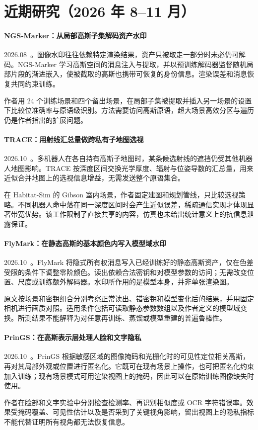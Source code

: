 \section{近期研究（2026 年 8--11 月）}
\paragraph{NGS-Marker：从局部高斯子集解码资产水印}
2026.08~\cite{2608_17447}。图像水印往往依赖特定渲染结果，资产只被取走一部分时未必仍可解码。NGS-Marker 学习高斯空间的消息注入与提取，并以预训练解码器监督随机局部片段的渐进嵌入，使被截取的高斯也携带可恢复的身份信息。渲染误差和消息恢复共同约束训练。

作者用 24 个训练场景和四个留出场景，在局部子集被提取并插入另一场景的设置下比较位准确率与原语级识别。方法需要访问高斯原语，超大场景高效分区与遍历仍是作者指出的扩展问题。

\paragraph{TRACE：用射线汇总量做跨私有子地图选视}
2026.10~\cite{2610_00822}。多机器人在各自持有高斯子地图时，某条候选射线的遮挡仍受其他机器人地图影响。TRACE 按深度区间交换光学厚度、辐射与位姿导数的汇总量，用来近似合并地图上的选视信息增益，无需发送整个原语集合。

在 Habitat-Sim 的 Gibson 室内场景，作者固定建图和规划管线，只比较选视策略。不同机器人命中落在同一深度区间时会产生近似误差，稀疏通信实现才体现显著带宽优势。该工作限制了直接共享的内容，仿真也未给出统计意义上的抗信息泄露保证。

\paragraph{FlyMark：在静态高斯的基本颜色内写入模型域水印}
2026.10~\cite{2610_11364}。FlyMark 将隐式所有权消息写入已经训练好的静态高斯资产，仅在色差受限的条件下调整零阶颜色。读出依赖合法密钥和对模型参数的访问；无需改变位置、尺度或训练额外解码器。水印所作用的是模型本身，并非单张渲染图。

原文按场景和密钥组合分别考察正常读出、错密钥和模型变化后的结果，并用固定相机进行画质对照。适用条件包括可读取静态参数数组以及作者定义的模型域变换。所测结果不能解释为对任意再训练、蒸馏或模型重建的普遍鲁棒性。

\paragraph{PrinGS：在高斯表示层处理人脸和文字隐私}
2026.10~\cite{2610_36168}。PrinGS 根据敏感区域的图像掩码和光栅化时的可见性定位相关高斯，再对其局部外观或位置进行匿名化。它既可在现有场景上操作，也可把匿名化约束加入训练；现有场景模式可用渲染视图上的掩码，因此可以在原始训练图像缺失时使用。

作者在脸部和文字实验中分别检查检测率、再识别相似度或 OCR 字符错误率。效果受掩码覆盖、可见性估计以及是否采到了关键视角影响，留出视图上的隐私指标不能代替证明所有视角都无法恢复信息。
